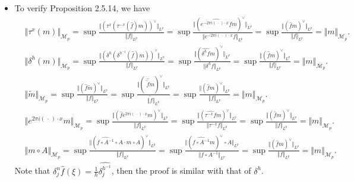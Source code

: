 \begin{itemize}
\item[2.5.2]
To verify Proposition 2.5.14, we have
\begin{align*}
&\Vert\tau^x(m)\Vert_{\mathscr{M}_{p}}
=\sup \frac{\Vert(\tau^{x}(\tau^{-x}(\hat{f})m))^\vee\Vert_{L^p}}{\Vert f\Vert_{L^p}}=
\sup \frac{\Vert(\widehat{e^{-2\pi i(\,\cdot\,)\cdot x}f}m)^\vee\Vert_{L^p}}{\Vert e^{-2\pi i(\,\cdot\,)\cdot x}f\Vert_{L^p}}=
\sup\frac{\Vert(\hat{f}m)^\vee\Vert_{L^p}}{\Vert f\Vert_{L^p}}
 =\Vert m\Vert_{\mathscr{M}_{p}}.\\
&\Vert\delta^h(m)\Vert_{\mathscr{M}_{p}}
=\sup \frac{\Vert(\delta^{h}(\delta^{h^{-1}}(\hat{f})m))^\vee\Vert_{L^p}}{\Vert f\Vert_{L^p}}=
\sup \frac{\Vert(\widehat{\delta^{h}f}m)^\vee\Vert_{L^p}}{\Vert \delta^{h}f\Vert_{L^p}}=
\sup\frac{\Vert(\hat{f}m)^\vee\Vert_{L^p}}{\Vert f\Vert_{L^p}}
 =\Vert m\Vert_{\mathscr{M}_{p}}.\\
&\Vert \widetilde{m}\Vert_{\mathscr{M}_{p}} 
=\sup\frac{\Vert(\hat{f}\widetilde{m})^\vee\Vert_{L^p}}{\Vert f\Vert_{L^p}}
=\sup\frac{\Vert(\,\,\hat{\!\!\tilde{f}}m)^\vee\Vert_{L^p}}{\Vert \tilde{f}\Vert_{L^p}}=
\sup\frac{\Vert(\hat{f}m)^\vee\Vert_{L^p}}{\Vert f\Vert_{L^p}}
 =\Vert m\Vert_{\mathscr{M}_{p}}.\\
&\Vert e^{2\pi i(\,\cdot\,)\cdot x}m\Vert_{\mathscr{M}_{p}} 
=\sup \frac{\Vert(\widehat{f}e^{2\pi i(\,\cdot\,)\cdot x}m)^\vee\Vert_{L^p}}{\Vert f\Vert_{L^p}}=
\sup\frac{\Vert(\widehat{\tau^{-x}f}m)^\vee\Vert_{L^p}}{\Vert \tau^{-x}f\Vert_{L^p}}=
\sup\frac{\Vert(\hat{f}m)^\vee\Vert_{L^p}}{\Vert f\Vert_{L^p}}=\Vert m\Vert_{\mathscr{M}_{p}}.\\
&\Vert m\circ A\Vert_{\mathscr{M}_{p}} =
\sup\frac{\Vert(\widehat{f\circ A^{-1}}\circ A\cdot m\circ A)^\vee\Vert_{L^p}}{\Vert f\Vert_{L^p}}=
\sup\frac{\Vert(\widehat{f\circ A^{-1}}m)^\vee\circ A\Vert_{L^p}}{\Vert f\circ A^{-1}\Vert_{L^p}}=
\sup\frac{\Vert(\hat{f}m)^\vee\Vert_{L^p}}{\Vert f\Vert_{L^p}}=\Vert m\Vert_{\mathscr{M}_{p}}.
\end{align*}
Note that $\delta_j^n\hat{f}(\xi)=\frac1h\widehat{\delta_j^{h^{-1}}}$, 
then the proof is similar with that of $\delta^h$.


\end{itemize}

